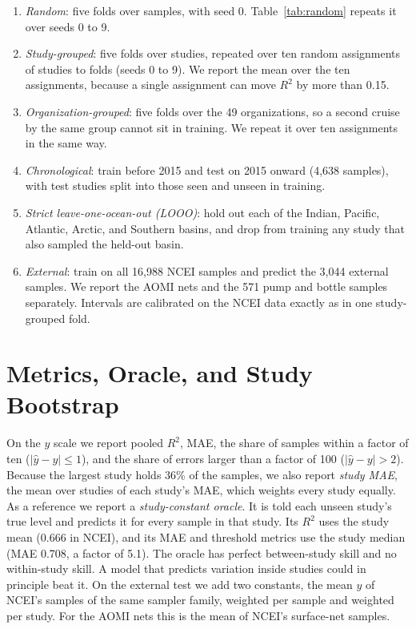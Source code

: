 \documentclass[12pt,a4paper]{report}
\newcommand{\Rsq}{$R^2$}
\begin{document}
\begin{enumerate}
\item \emph{Random}: five folds over samples, with seed 0. Table~\ref{tab:random} repeats it over seeds 0 to 9.
\item \emph{Study-grouped}: five folds over studies, repeated over ten random assignments of studies to folds (seeds 0 to 9). We report the mean over the ten assignments, because a single assignment can move \Rsq{} by more than 0.15.
\item \emph{Organization-grouped}: five folds over the 49 organizations, so a second cruise by the same group cannot sit in training. We repeat it over ten assignments in the same way.
\item \emph{Chronological}: train before 2015 and test on 2015 onward (4,638 samples), with test studies split into those seen and unseen in training.
\item \emph{Strict leave-one-ocean-out (LOOO)}: hold out each of the Indian, Pacific, Atlantic, Arctic, and Southern basins, and drop from training any study that also sampled the held-out basin.
\item \emph{External}: train on all 16,988 NCEI samples and predict the 3,044 external samples. We report the AOMI nets and the 571 pump and bottle samples separately. Intervals are calibrated on the NCEI data exactly as in one study-grouped fold.
\end{enumerate}

\section{Metrics, Oracle, and Study Bootstrap}

On the $y$ scale we report pooled \Rsq{}, MAE, the share of samples within a factor of ten ($|\hat{y}-y|\le1$), and the share of errors larger than a factor of 100 ($|\hat{y}-y|>2$). Because the largest study holds 36\% of the samples, we also report \emph{study MAE}, the mean over studies of each study's MAE, which weights every study equally. As a reference we report a \emph{study-constant oracle}. It is told each unseen study's true level and predicts it for every sample in that study. Its \Rsq{} uses the study mean (0.666 in NCEI), and its MAE and threshold metrics use the study median (MAE 0.708, a factor of 5.1). The oracle has perfect between-study skill and no within-study skill. A model that predicts variation inside studies could in principle beat it. On the external test we add two constants, the mean $y$ of NCEI's samples of the same sampler family, weighted per sample and weighted per study. For the AOMI nets this is the mean of NCEI's surface-net samples.
\end{document}
